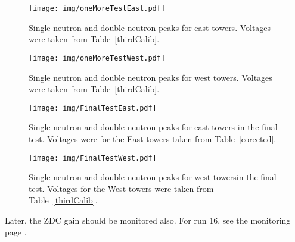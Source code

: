 \begin{figure}[htb]
\begin{center}
\texttt{[image: img/oneMoreTestEast.pdf]}
\end{center}
\caption{Single neutron and double neutron peaks for east towers.
Voltages were taken from Table~\ref{thirdCalib}.}
\label{oneMoreTestEast}
\end{figure}

\begin{figure}[htb]
\begin{center}
\texttt{[image: img/oneMoreTestWest.pdf]}
\end{center}
\caption{Single neutron and double neutron peaks for west towers. 
Voltages were taken from Table~\ref{thirdCalib}.}
\label{oneMoreTestWest}
\end{figure}

\begin{figure}[htb]
\begin{center}
\texttt{[image: img/FinalTestEast.pdf]}
\end{center}
\caption{Single neutron and double neutron peaks for east towers in the final test. Voltages were
for the East towers taken from Table~\ref{corected}.}
\label{finalTestEast}
\end{figure}

\begin{figure}[htb]
\begin{center}
\texttt{[image: img/FinalTestWest.pdf]}
\end{center}
\caption{Single neutron and double neutron peaks for west towersin the final test. Voltages
for the West towers were taken from Table~\ref{thirdCalib}.}
\label{finalTestWest}
\end{figure}

Later, the ZDC gain should be monitored also. For run 16, see the monitoring page \cite{ZDCmonPage}.
